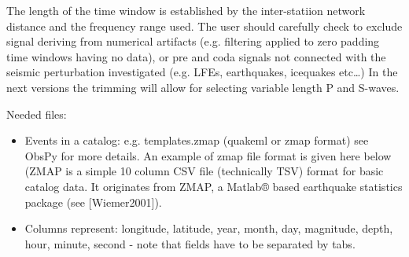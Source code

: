 \documentclass[a4paper,12pt,english]{sphinxmanual}
\begin{document}
The length of the time window is established by the inter-statiion network distance and the frequency range used.
The user should carefully check to exclude signal deriving from numerical artifacts (e.g. filtering applied to zero padding
time windows having no data), or pre and coda signals not connected with the seismic perturbation investigated (e.g. LFEs, earthquakes, icequakes etc…)
In the next versions the trimming will allow for selecting variable length P and S-waves.

Needed files:
\begin{itemize}
\item {} 
Events in a catalog: e.g. templates.zmap (quakeml or zmap format) see ObsPy for more details. An example of zmap file format is given here below (ZMAP is a simple 10 column CSV file (technically TSV) format for basic catalog data. It originates from ZMAP, a Matlab® based earthquake statistics package (see {[}Wiemer2001{]}).

\item {} 
Columns represent: longitude, latitude, year, month, day, magnitude, depth, hour, minute, second - note that fields have to be separated by tabs.

\end{itemize}
\end{document}
